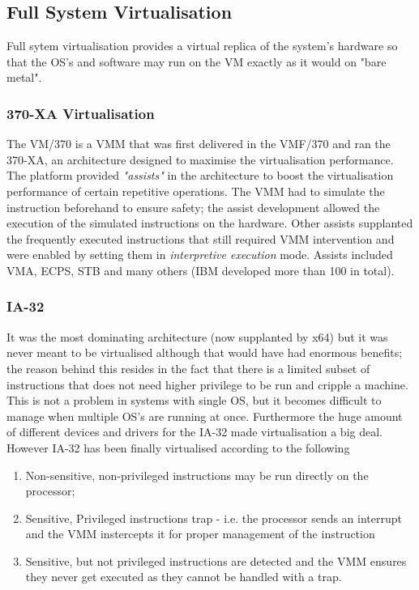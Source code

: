 \documentclass[paper=a4, fontsize=11pt]{report} %
\numberwithin{equation}{section} %
\numberwithin{figure}{section} %
\numberwithin{table}{section} %
\begin{document}
\subsection{Full System Virtualisation}
Full sytem virtualisation provides a virtual replica of the system's hardware 
so that the OS's and software may run on the VM exactly as it would on "bare 
metal".
\subsubsection{370-XA Virtualisation} The VM/370 is a VMM that was first delivered
in the VMF/370 and ran the 370-XA, an architecture designed to maximise the 
virtualisation performance. The platform provided \textit{"assists"} in the 
architecture to boost the virtualisation performance of certain repetitive 
operations. The VMM had to simulate the instruction beforehand to ensure 
safety; the assist development allowed the execution of the simulated 
instructions on the hardware. Other assists supplanted the frequently executed 
instructions that still required VMM intervention and were enabled by setting 
them in \textit{interpretive execution} mode. Assists included VMA, ECPS, STB 
and many others (IBM developed more than 100 in total).
\subsubsection{IA-32} It was the most dominating architecture (now supplanted by
x64) but it was never meant to be virtualised although that would have had 
enormous benefits; the reason behind this resides in the fact that there is a 
limited subset of instructions that does not need higher privilege to be run 
and cripple a machine. This is not a problem in systems with single OS, but it 
becomes difficult to manage when multiple OS's are running at once. Furthermore 
the huge amount of different devices and drivers for the IA-32 made 
virtualisation a big deal. However IA-32 has been finally virtualised according 
to the following
\begin{enumerate}
	\item Non-sensitive, non-privileged instructions may be run directly on the 
	processor;
	\item Sensitive, Privileged instructions trap - i.e. the processor sends an 
	interrupt and the VMM instercepts it for proper management of the 
	instruction
	\item Sensitive, but not privileged instructions are detected and the VMM 
	ensures they never get executed as they cannot be handled with a trap.
\end{enumerate}
\end{document}

